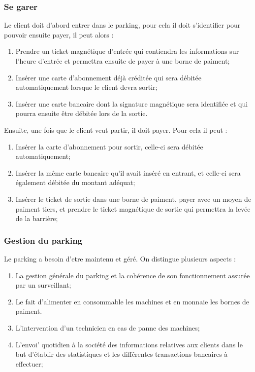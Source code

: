 \documentclass[a4paper]{article}
\begin{document}
\subsubsection{Se garer}
Le client doit d'abord entrer dans le parking, pour cela il doit s'identifier pour pouvoir ensuite payer, il peut alors :
\begin{enumerate}
		\item Prendre un ticket magn\'etique d'entr\'ee qui contiendra les informations sur l'heure d'entr\'ee et permettra ensuite de payer \`a une borne de paiment;
		\item Ins\'erer une carte d'abonnement d\'ej\`a cr\'edit\'ee qui sera d\'ebit\'ee automatiquement lorsque le client devra sortir;
		\item Ins\'erer une carte bancaire dont la signature magn\'etique sera identifi\'ee et qui pourra ensuite être d\'ebit\'ee lors de la sortie.
\end{enumerate}

Ensuite, une fois que le client veut partir, il doit payer. Pour cela il peut :
\begin{enumerate}
		\item Ins\'erer la carte d'abonnement pour sortir, celle-ci sera d\'ebit\'ee automatiquement;
		\item Ins\'erer la même carte bancaire qu'il avait ins\'er\'e en entrant, et celle-ci sera \'egalement d\'ebit\'ee du montant ad\'equat;
		\item Ins\'erer le ticket de sortie dans une borne de paiment, payer avec un moyen de paiment tiers, et prendre le ticket magn\'etique de sortie qui permettra la lev\'ee de la barrière;
\end{enumerate}

\subsubsection{Gestion du parking}
Le parking a besoin d'etre maintenu et g\'er\'e. On distingue plusieurs aspects :
\begin{enumerate}
		\item La gestion g\'en\'erale du parking et la coh\'erence de son fonctionnement assur\'ee par un surveillant;
		\item Le fait d'alimenter en consommable les machines et en monnaie les bornes de paiment.
		\item L'intervention d'un technicien en cas de panne des machines;
		\item L'envoi' quotidien \`a la soci\'et\'e des informations relatives aux clients dans le but d'\'etablir des statistiques et les diff\'erentes transactions bancaires \`a effectuer;
\end{enumerate}
\end{document}
